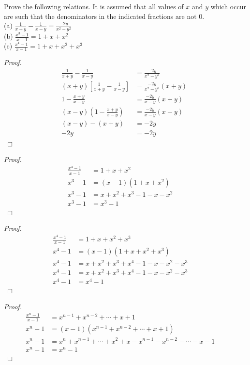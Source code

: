 \documentclass[6pt]{article}
\begin{document}
\begin{tcolorbox}[title=Problem 2, breakable]
Prove the following relations. It is assumed that all values of $x$ and $y$
which occur are such that the denominators in the indicated fractions are not $0$. \\
(a) $\frac{1}{x + y} - \frac{1}{x - y} = \frac{-2y}{x^2 - y^2}$ \\
(b) $\frac{x^3 - 1}{x - 1} = 1 + x + x^2$ \\
(c) $\frac{x^4 - 1}{x - 1} = 1 + x + x^2 + x^3$
\end{tcolorbox}

\begin{proof}
\begin{align*}
\frac{1}{x + y} - \frac{1}{x - y} &= \frac{-2y}{x^2 - y^2} \\
(x + y)[\frac{1}{x + y} - \frac{1}{x - y}] &= \frac{-2y}{x^2 - y^2}(x + y) \\
1 - \frac{x + y}{x - y} &= \frac{-2y}{x - y}(x + y) \\
(x - y)(1 - \frac{x + y}{x - y}) &= \frac{-2y}{x - y}(x - y) \quad \text{} \\
(x - y) - (x + y) &= -2y\\
-2y &= -2y
\end{align*}
\end{proof}
\begin{proof}
\begin{align*}
\frac{x^3 - 1}{x - 1} &= 1 + x + x^2 && \\
x^3 - 1 &= (x-1)(1 + x + x^2) && \\
x^3 - 1 &= x + x^2 + x^3 - 1 - x - x^2  && \\
x^3 - 1 &= x^3 - 1
\end{align*}
\end{proof}
\begin{proof}
\begin{align*}
\frac{x^4 - 1}{x - 1} &= 1 + x + x^2 + x^3 && \\
x^4 - 1 &= (x - 1)(1 + x + x^2 + x^3) && \\
x^4 - 1 &= x + x^2 + x^3 + x^4 - 1 - x - x^2 - x^3 && \\
x^4 - 1 &= x + x^2 + x^3 + x^4 - 1 - x - x^2 - x^3 && \\
x^4 - 1 &= x^4 - 1
\end{align*}
\end{proof}
\begin{proof}
\begin{align*}
\frac{x^n - 1}{x - 1} &= x^{n - 1} + x^{n - 2} + \cdots + x + 1 && \\
x^n - 1 &= (x - 1)(x^{n - 1} + x^{n - 2} + \cdots + x + 1) && \\
x^n - 1 &= x^{n} + x^{n - 1} + \cdots + x^2 + x - x^{n - 1} - x^{n - 2} - \cdots -x - 1  && \\
x^n - 1 &= x^n - 1
\end{align*}
\end{proof}
\end{document}
